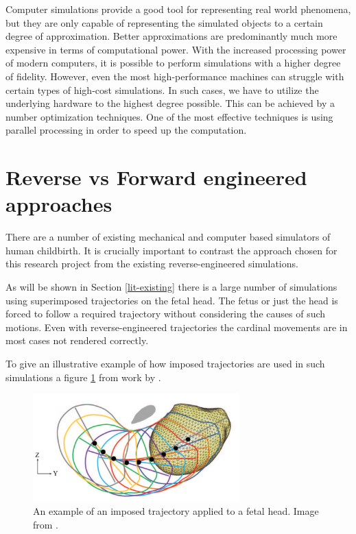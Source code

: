 Computer simulations provide a good tool for representing real world phenomena, but they are only capable of representing the simulated objects to a certain degree of approximation. Better approximations are predominantly much more expensive in terms of computational power. With the increased processing power of modern computers, it is possible to perform simulations with a higher degree of fidelity. However, even the most high-performance machines can struggle with certain types of high-cost simulations. In such cases, we have to utilize the underlying hardware to the highest degree possible. This can be achieved by a number optimization techniques. One of the most effective techniques is using parallel processing in order to speed up the computation.

\section{Reverse vs Forward engineered approaches}

There are a number of existing mechanical and computer based simulators of human childbirth. It is crucially important to contrast the approach chosen for this research project from the existing reverse-engineered simulations.

As will be shown in Section \ref{lit-existing} there is a large number of simulations using superimposed trajectories on the fetal head. The fetus or just the head is forced to follow a required trajectory without considering the causes of such motions. Even with reverse-engineered trajectories the cardinal movements are in most cases not rendered correctly.

To give an illustrative example of how imposed trajectories are used in such simulations a figure \ref{introduction-imposed-trajectory} from work by \citet{DejunJing2013}.

\begin{figure}
\centering
  \includegraphics[width=80mm]{sections/introduction/images/imposed-trajectory.png}
\caption{ \label{introduction-imposed-trajectory} An example of an imposed trajectory applied to a fetal head. Image from \cite{DejunJing2013}. }
\end{figure}

